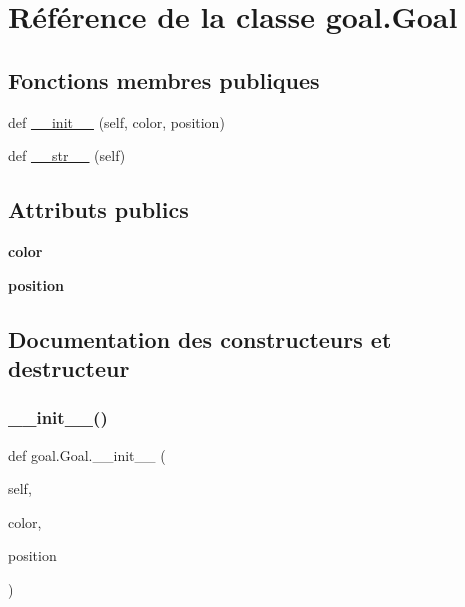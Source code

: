 \hypertarget{classgoal_1_1Goal}{}\section{Référence de la classe goal.\+Goal}
\label{classgoal_1_1Goal}
\subsection*{Fonctions membres publiques}
\begin{DoxyCompactItemize}
\item 
def \hyperlink{classgoal_1_1Goal_ab9a39523eac5144fe1102e23e94acd5b}{\+\_\+\+\_\+init\+\_\+\+\_\+} (self, color, position)
\item 
def \hyperlink{classgoal_1_1Goal_af125fb03f7d4358fbf776a30da242df1}{\+\_\+\+\_\+str\+\_\+\+\_\+} (self)
\end{DoxyCompactItemize}
\subsection*{Attributs publics}
\begin{DoxyCompactItemize}
\item 
\mbox{\label{classgoal_1_1Goal_a54d5132d78565d7996ec4c31c41a0192}} 
{\bfseries color}
\item 
\mbox{\label{classgoal_1_1Goal_a33e1f2b7e55c34c8288aef4f79697d23}} 
{\bfseries position}
\end{DoxyCompactItemize}


\subsection{Documentation des constructeurs et destructeur}
\mbox{\label{classgoal_1_1Goal_ab9a39523eac5144fe1102e23e94acd5b}} 
\subsubsection{\texorpdfstring{\+\_\+\+\_\+init\+\_\+\+\_\+()}{\_\_init\_\_()}}
{\footnotesize\ttfamily def goal.\+Goal.\+\_\+\+\_\+init\+\_\+\+\_\+ (\begin{DoxyParamCaption}\item[{}]{self,  }\item[{}]{color,  }\item[{}]{position }\end{DoxyParamCaption})}


